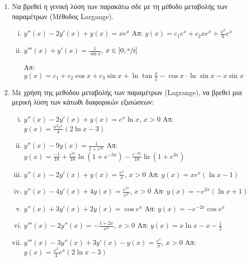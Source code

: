 \begin{enumerate}
\begin{enumerate}[i)]
\end{enumerate}

\item Να βρεθεί η γενική λύση των παρακάτω σδε με τη μέθοδο μεταβολής των παραμέτρων (Μέθοδος \textlatin{Largange}).

\begin{enumerate}[i)]
  \item $y''(x)-2y'(x)+y(x)=xe^{x}$ \hfill Απ: $y(x)=c_{1}e^{x}+c_{2}xe^{x}+\frac{x^{3}}{6}e^{x}$
  \item $y'''(x)+y'(x)=\frac{1}{\sin x}$, $x\in [0,\sfrac{\pi}{2}]$

   \hfill Απ: $y(x)=c_{1}+c_2\cos x+c_3 \sin x+\ln \tan \frac{x}{2}-\cos x\cdot\ln\sin x-x\sin x$

   \end{enumerate}

   \item Με χρήση της μεθόδου μεταβολής των παραμέτρων (\textlatin{Lagrange}), να βρεθεί μια μερική λύση των κάτωθι διαφορικών εξισώσεων:

   \begin{enumerate}[i)]
  \item $y''(x)-2y'(x)+y(x)=e^{x}\ln x$, $x>0$ \hfill Απ: $y(x)=\frac{x^{2}e^{x}}{4}(2\ln x-3)$
  \item $y''(x)-9y(x)=\frac{1}{1+e^{3x}}$ \hfill Απ: $y(x)=\frac{-1}{18}+\frac{e^{3x}}{18}\ln (1+e^{-3x})-\frac{e^{-3x}}{18}\ln(1+e^{3x})$
  \item $y''(x)-2y'(x)+y(x)=\frac{e^x}{x}$, $x>0$ \hfill Απ: $y(x)=xe^{x}(\ln x-1)$
  \item $y''(x)-4y'(x)+4y(x)=\frac{e^{2x}}{x^{2}}$, $x>0$ \hfill Απ: $y(x)=-e^{2x}(\ln x +1)$
  \item $y''(x)+3y'(x)+2y(x)=\cos e^{x}$ \hfill Απ: $y(x)=-e^{-2x}\cos e^{x}$
  \item $y'''(x)-2y''(x)=-\frac{1+2x}{x^{2}}$, $x>0$ \hfill Απ: $y(x)=x\ln x-x -\frac{1}{2}$
  \item $y'''(x)-3y''(x)+3y'(x)-y(x)=\frac{e^{x}}{x}$, $x>0$ \hfill Απ: $y(x)=\frac{x^{2}}{4}e^{x}(2\ln x-3)$
\end{enumerate}

\end{enumerate}




